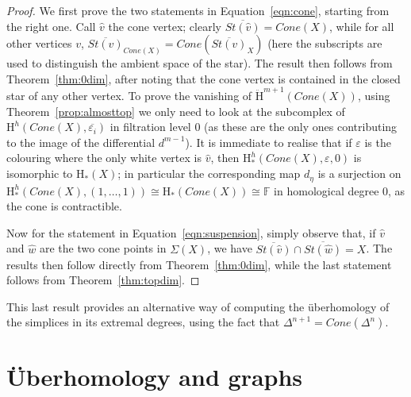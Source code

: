 \documentclass[11pt, a4paper, reqno, twoside, makeidx]{amsart}
\theoremstyle{remark}
\theoremstyle{plain}
\theoremstyle{definition}
\newcommand{\F}{\mathbb{F}}
\newcommand{\HH}{\mathrm{H}}
\newcommand{\uH}{\ddot{\mathrm{H}}}
\begin{document}
\begin{proof}
We first prove the two statements in Equation~\eqref{eqn:cone}, starting from the right one. Call $\hat{v}$ the cone vertex; clearly $\overline{St(\hat{v})} = Cone(X)$, while for all other vertices $v$,  $\overline{St(v)}_{Cone(X)} = Cone(\overline{St(v)}_X)$ (here the subscripts are used to distinguish the ambient space of the star). The result then follows from Theorem~\ref{thm:0dim}, after noting that the cone vertex is contained in the closed star of any other vertex.
To prove the vanishing of $\uH^{m+1}(Cone(X))$, using Theorem~\ref{prop:almosttop} we only need to look at the subcomplex of $\HH^h(Cone(X), \overline{\varepsilon_i})$ in filtration level $0$ (as these are the only ones contributing to the image of the differential $d^{m-1}$). It is immediate to realise that if $\varepsilon$ is the colouring where the only white vertex is $\hat{v}$, then  $\HH^h_*(Cone(X), \varepsilon,0)$ is isomorphic to $\HH_*(X)$; in particular the corresponding map $d_\eta$ is a surjection on $\HH^h_*(Cone(X), (1,\ldots, 1)) \cong \HH_*(Cone(X)) \cong \F$ in homological degree $0$, as the cone is contractible.

Now for the statement in Equation~\eqref{eqn:suspension}, simply observe that, if $\hat{v}$ and  $\hat{w}$ are the two cone points in $\Sigma(X)$, we have $\overline{St(\hat{v})} \cap \overline{St(\hat{w})} = X$. The results then follow directly from Theorem~\ref{thm:0dim}, while the last statement follows from Theorem~\ref{thm:topdim}.
\end{proof}

This last result provides an alternative way of computing the \"uberhomology of the simplices in its extremal degrees, using the fact that $\Delta^{n+1} = Cone(\Delta^n)$.



























\section{\"Uberhomology and graphs}\label{sec:ubergraphs}
\end{document}

